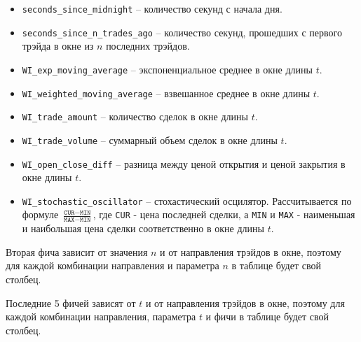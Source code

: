 \begin{itemize}
    \item \texttt{seconds\_since\_midnight} -- количество секунд с начала дня.
    \item \texttt{seconds\_since\_n\_trades\_ago} -- количество секунд, прошедших с первого трэйда в окне из $n$ последних трэйдов.
    \item \texttt{WI\_exp\_moving\_average} -- экспоненциальное среднее в окне длины $t$.
    \item \texttt{WI\_weighted\_moving\_average} -- взвешанное среднее в окне длины $t$.
    \item \texttt{WI\_trade\_amount} -- количество сделок в окне длины $t$.
    \item \texttt{WI\_trade\_volume} -- суммарный объем сделок в окне длины $t$.
    \item \texttt{WI\_open\_close\_diff} -- разница между ценой открытия и ценой закрытия в окне длины $t$.
    \item \texttt{WI\_stochastic\_oscillator} -- стохастический осцилятор. Рассчитывается по формуле $\frac{\texttt{CUR} - \texttt{MIN}}{\texttt{MAX} - \texttt{MIN}}$, где \texttt{CUR} - цена последней сделки, а \texttt{MIN} и \texttt{MAX} - наименьшая и наибольшая цена сделки соответственно в окне длины $t$.
\end{itemize}

Вторая фича зависит от значения $n$ и от направления трэйдов в окне, поэтому для каждой комбинации направления и параметра $n$ в таблице будет свой столбец.

Последние 5 фичей зависят от $t$ и от направления трэйдов в окне, поэтому для каждой комбинации направления, параметра $t$ и фичи в таблице будет свой столбец.